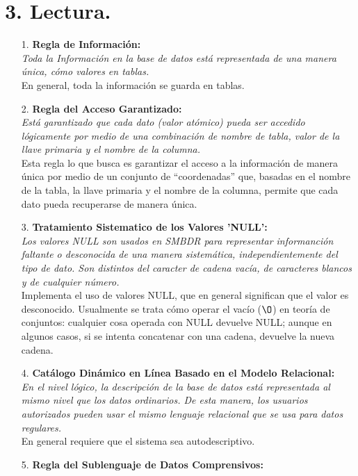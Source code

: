 \documentclass[a4paper, 12pt]{report}
\begin{document}
\section*{3. Lectura.}{
\begin{enumerate}
\item[1.]{\textbf{Regla de Información: } \\
    \textit{Toda la Información en la base de datos está representada de una
    manera única, cómo valores en tablas.}\\
    En general, toda la información se guarda en tablas.
}
\item[2.]{\textbf{Regla del Acceso Garantizado: }\\
    \textit{Está garantizado que cada dato (valor atómico) pueda ser accedido
    lógicamente por medio de una combinación de nombre de tabla, valor de la
    llave primaria y el nombre de la columna.}\\
    Esta regla lo que busca es garantizar el acceso a la información de manera
    única por medio de un conjunto de ``coordenadas'' que, basadas en el nombre
    de la tabla, la llave primaria y el nombre de la columna, permite que cada
    dato pueda recuperarse de manera única.
}
\item[3.]{\textbf{Tratamiento Sistematico de los Valores 'NULL': }\\\textit{
    Los valores NULL son usados en SMBDR para representar informanción faltante
    o desconocida de una manera sistemática, independientemente del tipo de dato.
    Son distintos del caracter de cadena vacía, de caracteres blancos y de
    cualquier número.}\\
    Implementa el uso de valores NULL, que en general significan que el valor
    es desconocido. Usualmente se trata cómo operar el vacío ($\O$) en teoría de
    conjuntos: cualquier cosa operada con NULL devuelve NULL; aunque en algunos
    casos, si se intenta concatenar con una cadena, devuelve la nueva cadena.
}
\item[4.]{\textbf{Catálogo Dinámico en Línea Basado en el Modelo Relacional:}\\
    \textit{En el nivel lógico, la descripción de la base de datos está
    representada al mismo nivel que los datos ordinarios. De esta manera, los
    usuarios autorizados pueden usar el mismo lenguaje relacional que se usa
    para datos regulares.}\\
    En general requiere que el sistema sea autodescriptivo.
}
\item[5.]{\textbf{Regla del Sublenguaje de Datos Comprensivos:}\\
}
\end{enumerate}}
\end{document}
